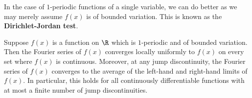 \documentclass[12pt]{article}
\begin{document}
    In the case of \(1\)-periodic functions of a single variable, we can do better as we may merely assume \(f(x)\) is of bounded variation. This is known as the \textbf{Dirichlet-Jordan test}.

    \begin{theorem*}
      Suppose \(f(x)\) is a function on \(\R\) which is \(1\)-periodic and of bounded variation. Then the Fourier series of \(f(x)\) converges locally uniformly to \(f(x)\) on every set where \(f(x)\) is continuous. Moreover, at any jump discontinuity, the Fourier series of \(f(x)\) converges to the average of the left-hand and right-hand limits of \(f(x)\). In particular, this holds for all continuously differentiable functions with at most a finite number of jump discontinuities.
    \end{theorem*}
\end{document}
